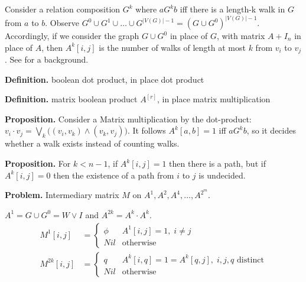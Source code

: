 Consider a relation composition $G^k$ where $a G^k b$ iff there is a length-k walk in $G$ from $a$ to $b$. Observe $G^0 \cup G^1 \cup \dots \cup G^{|V(G)|-1} = (G \cup G^0)^{|V(G)|-1}$. Accordingly, if we consider the graph $G \cup G^0$ in place of $G$, with matrix $A + I_n$ in place of $A$, then $A^k[i,j]$ is the number of walks of length at most $k$ from $v_i$ to $v_j$. See \cite{discreteHandbook} for a background.

\textbf{Definition.} boolean dot product, in place dot product

\textbf{Definition.} matrix boolean product $A^{[r]}$, in place matrix multiplication

\textbf{Proposition.} Consider a Matrix multiplication by the dot-product: $v_i \cdot v_j = \bigvee_k \big ( (v_i, v_k) \wedge (v_k, v_j) \big )$. It follows $A^k[a,b] = 1$ iff $a G^k b$, so it decides whether a walk exists instead of counting walks.

\textbf{Proposition.} For $k < n-1$, if $A^k[i,j] = 1$ then there is a path, but if $A^k[i,j] = 0$ then the existence of a path from $i$ to $j$ is undecided.

\textbf{Problem.} Intermediary matrix $M$ on $A^1, A^2, A^4, \dots, A^{2^m}$.

$A^1 = G \cup G^0 = W \vee I$ and $A^{2k} = A^k \cdot A^k$.
\begin{align*}
M^1[i,j] &= \begin{cases} 
      \phi & A^1[i,j]=1, \; i \neq j \\
      Nil & \text{otherwise}
    \end{cases} \\
M^{2k}[i,j] &= \begin{cases} 
      q & A^k[i,q] = 1 = A^k[q,j], \; i,j,q \text{ distinct} \\
      Nil & \text{otherwise}
    \end{cases}
\end{align*}

